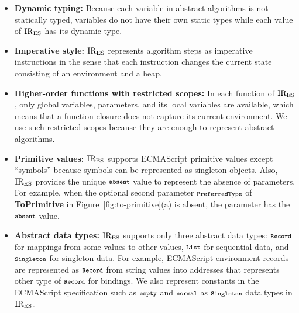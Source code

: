 \begin{itemize}[leftmargin=0.5cm]
\item \textbf{Dynamic typing:} Because each variable in abstract
algorithms is not statically typed, variables do not have their own
static types while each value of \( \text{IR}_\text{ES} \) has its dynamic type.

\item \textbf{Imperative style:} \( \text{IR}_\text{ES} \) represents algorithm steps
as imperative instructions in the sense that each instruction changes
the current state consisting of an environment and a heap.

\item \textbf{Higher-order functions with restricted scopes:}
In each function of \( \text{IR}_\text{ES} \), only global variables, parameters,
and its local variables are available, which means that a function
closure does not capture its current environment.  We use such
restricted scopes because they are enough to represent abstract
algorithms.

\item \textbf{Primitive values:} \( \text{IR}_\text{ES} \) supports ECMAScript
primitive values except ``symbols'' because symbols can be represented
as singleton objects.  Also, \( \text{IR}_\text{ES} \) provides the unique \(
\texttt{\footnotesize absent} \) value to represent the absence of parameters.  For
example, when the optional second parameter \( \texttt{\footnotesize PreferredType} \)
of \textbf{ToPrimitive} in Figure~\ref{fig:to-primitive}(a) is absent,
the parameter has the \( \texttt{\footnotesize absent} \) value.

\item \textbf{Abstract data types:} \( \text{IR}_\text{ES} \) supports only three
abstract data types: \( \texttt{\footnotesize Record} \) for mappings from some values
to other values, \( \texttt{\footnotesize List} \) for sequential data, and
\( \texttt{\footnotesize Singleton} \) for singleton data.  For example, ECMAScript
environment records are represented as \( \texttt{\footnotesize Record} \)
from string values into addresses that represents other type of
\( \texttt{\footnotesize Record} \) for bindings.  We also represent constants
in the ECMAScript specification such as \( \texttt{\footnotesize empty} \)
and \( \texttt{\footnotesize normal} \) as \( \texttt{\footnotesize Singleton} \) data types
in \( \text{IR}_\text{ES} \).
\end{itemize}

